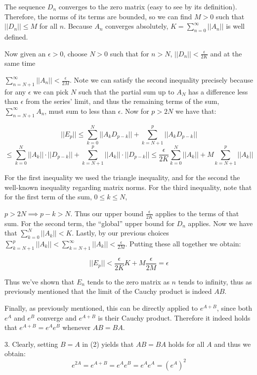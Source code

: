 \begin{solution}
    The sequence $D_n$ converges to the zero matrix (easy to see by its definition). Therefore, the norms of its terms are bounded, so we can find $M > 0$ such that $\lvert \lvert D_n \rvert \rvert \leq M$ for all $n$. Because $A_n$ converges absolutely, $K = \sum_{n=0}^{\infty} \lvert \lvert A_n \rvert \rvert$ is well defined. 
    
    Now given an $\epsilon > 0$, choose $N > 0$ such that for $n > N$, $\lvert \lvert D_n \rvert \rvert < \frac{\epsilon}{2K}$ and at the same time
    
    $\sum_{n=N+1}^{\infty} \lvert \lvert A_n \rvert \rvert < \frac{\epsilon}{2M}$. Note we can satisfy the second inequality precisely because for any $\epsilon$ we can pick $N$ such that the partial sum up to $A_N$ has a difference less than $\epsilon$ from the series' limit, and thus the remaining terms of the sum, $\sum_{n=N+1}^{\infty}A_n$, must sum to less than $\epsilon$. Now for $p > 2N$ we have that:

    $$\lvert \lvert E_p \rvert \rvert \leq \sum_{k=0}^{N} \lvert \lvert A_k D_{p-k} \rvert \rvert + \sum_{k=N+1}^{p}\lvert \lvert A_k D_{p-k} \rvert \rvert $$
    $$\leq \sum_{k=0}^{N}\lvert \lvert A_k \rvert \rvert \cdot \lvert \lvert D_{p-k} \rvert \rvert + \sum_{k=N+1}^{p} \lvert \lvert A_k \rvert \rvert \cdot \lvert \lvert D_{p-k} \rvert \rvert \leq \frac{\epsilon}{2K} \sum_{k=0}^{N}\lvert \lvert A_k \rvert \rvert + M \sum_{k=N+1}^{p}\lvert \lvert A_k \rvert \rvert$$

    For the first inequality we used the triangle inequality, and for the second the well-known inequality regarding matrix norms. For the third inequality, note that for the first term of the sum, $0 \leq k \leq N$, 
    
    $p > 2N \implies p - k > N$. Thus our upper bound $\frac{\epsilon}{2K}$ applies to the terms of that sum. For the second term, the ``global'' upper bound for $D_n$ applies. Now we have that $\sum_{k=0}^{N}\lvert \lvert A_k \rvert \rvert < K$. Lastly, by our previous choices $\sum_{k=N+1}^{p}\lvert \lvert A_k \rvert \rvert < \sum_{k=N+1}^{\infty}\lvert \lvert A_k \rvert \rvert < \frac{\epsilon}{2M}$. Putting these all together we obtain:

    $$\lvert \lvert E_p \rvert \rvert < \frac{\epsilon}{2K}K + M\frac{\epsilon}{2M} = \epsilon$$

    Thus we've shown that $E_n$ tends to the zero matrix as $n$ tends to infinity, thus as previously mentioned that the limit of the Cauchy product is indeed $AB$.

    Finally, as previously mentioned, this can be directly applied to $e^{A+B}$, since both $e^A$ and $e^B$ converge and $e^{A+B}$ is their Cauchy product. Therefore it indeed holds that $e^{A+B} = e^Ae^B$ whenever $AB=BA$.

    3. Clearly, setting $B=A$ in (2) yields that $AB = BA$ holds for all $A$ and thus we obtain:
    $$e^{2A} = e^{A+B} = e^Ae^B = e^Ae^A = {(e^A)}^2$$
    
\end{solution}

